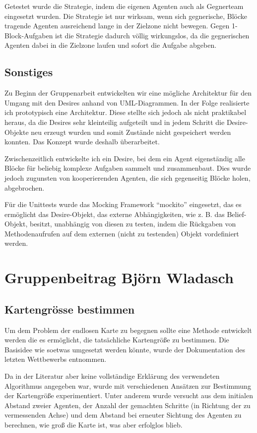\documentclass[runningheads]{llncs}
\begin{document}
Getestet wurde die Strategie, indem die eigenen Agenten auch als Gegnerteam eingesetzt wurden. Die Strategie ist nur wirksam, wenn sich gegnerische, Blöcke tragende Agenten ausreichend lange in der Zielzone nicht bewegen. Gegen 1-Block-Aufgaben ist die Strategie dadurch völlig wirkungslos, da die gegnerischen Agenten dabei in die Zielzone laufen und sofort die Aufgabe abgeben.

\subsection{Sonstiges}
Zu Beginn der Gruppenarbeit entwickelten wir eine mögliche Architektur für den Umgang mit den Desires anhand von UML-Diagrammen. In der Folge realisierte ich prototypisch eine Architektur. Diese stellte sich jedoch als nicht praktikabel heraus, da die Desires sehr kleinteilig aufgeteilt und in jedem Schritt die Desire-Objekte neu erzeugt wurden und somit Zustände nicht gespeichert werden konnten. Das Konzept wurde deshalb überarbeitet.

Zwischenzeitlich entwickelte ich ein Desire, bei dem ein Agent eigenständig alle Blöcke für beliebig komplexe Aufgaben sammelt und zusammenbaut. Dies wurde jedoch zugunsten von kooperierenden Agenten, die sich gegenseitig Blöcke holen, abgebrochen.

Für die Unittests wurde das Mocking Framework "`mockito"' eingesetzt, das es ermöglicht das Desire-Objekt, das externe Abhängigkeiten, wie z. B. das Belief-Objekt, besitzt, unabhängig von diesen zu testen, indem die Rückgaben von Methodenaufrufen auf dem externen (nicht zu testenden) Objekt vordefiniert werden. 

\section{Gruppenbeitrag Björn Wladasch}
\subsection{Kartengrösse bestimmen}
Um dem Problem der endlosen Karte zu begegnen sollte eine Methode entwickelt werden die es ermöglicht, die tatsächliche Kartengröße zu bestimmen. Die Basisidee wie soetwas umgesetzt werden könnte, wurde der Dokumentation des letzten Wettbewerbs \cite{MAPC2021} entnommen.  

Da in der Literatur aber keine vollständige Erklärung des verwendeten Algorithmus angegeben war, wurde mit verschiedenen Ansätzen zur Bestimmung der Kartengröße experimentiert. Unter anderem wurde versucht aus dem initialen Abstand zweier Agenten, der Anzahl der gemachten Schritte (in Richtung der zu vermessenden Achse) und dem Abstand bei erneuter Sichtung des Agenten zu berechnen, wie groß die Karte ist, was aber erfolglos blieb.
\end{document}
